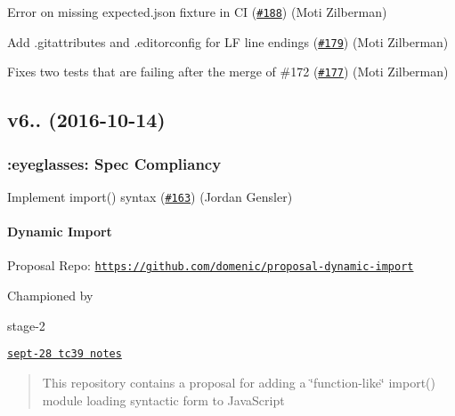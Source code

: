 Error on missing expected.\+json fixture in CI (\href{https://github.com/babel/babylon/pull/188}{\tt \#188}) (Moti Zilberman)

Add .gitattributes and .editorconfig for LF line endings (\href{https://github.com/babel/babylon/pull/179}{\tt \#179}) (Moti Zilberman)

Fixes two tests that are failing after the merge of \#172 (\href{https://github.com/babel/babylon/pull/177}{\tt \#177}) (Moti Zilberman)

\subsection*{v6.. (2016-\/10-\/14)}

\subsubsection*{\+:eyeglasses\+: Spec Compliancy}

Implement import() syntax (\href{https://github.com/babel/babylon/pull/163}{\tt \#163}) (Jordan Gensler)

\paragraph*{Dynamic Import}


\begin{DoxyItemize}
\item Proposal Repo\+: \href{https://github.com/domenic/proposal-dynamic-import}{\tt https\+://github.\+com/domenic/proposal-\/dynamic-\/import}
\item Championed by \href{https://github.com/domenic}{\tt }
\item stage-\/2
\item \href{https://github.com/rwaldron/tc39-notes/blob/master/es7/2016-09/sept-28.md#113a-import}{\tt sept-\/28 tc39 notes}
\end{DoxyItemize}

\begin{quote}
This repository contains a proposal for adding a \char`\"{}function-\/like\char`\"{} import() module loading syntactic form to Java\+Script \end{quote}





